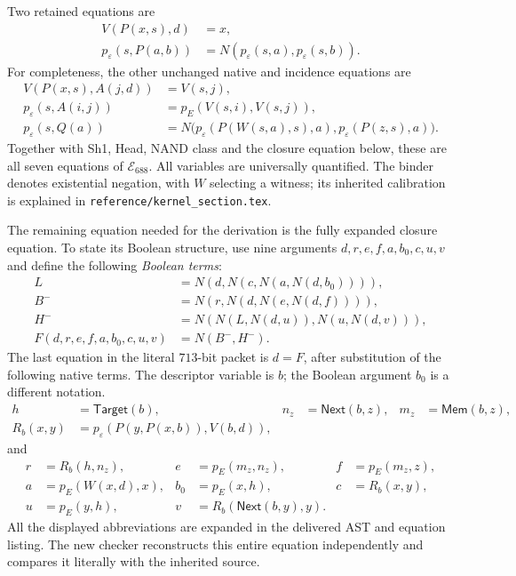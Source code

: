 Two retained equations are
\begin{align*}
 V(P(x,s),d)&=x,\tag{Head}\\
 p_\varepsilon(s,P(a,b))
    &=N(p_\varepsilon(s,a),p_\varepsilon(s,b)).\tag{NAND class}
\end{align*}
For completeness, the other unchanged native and incidence equations are
\begin{align*}
 V(P(x,s),A(j,d))&=V(s,j),\tag{Native tail}\\
 p_\varepsilon(s,A(i,j))&=p_E(V(s,i),V(s,j)),\tag{Atom class}\\
 p_\varepsilon(s,Q(a))
   &=N\bigl(p_\varepsilon(P(W(s,a),s),a),
            p_\varepsilon(P(z,s),a)\bigr).\tag{Binder}
\end{align*}
Together with Sh1, Head, NAND class and the closure equation below,
these are all seven equations of $\mathcal E_{688}$. All variables are
universally quantified. The binder denotes existential negation, with
$W$ selecting a witness; its inherited calibration is explained in
\texttt{reference/kernel\_section.tex}.

The remaining equation needed for the derivation is the fully expanded
closure equation. To state its Boolean structure, use nine arguments
$d,r,e,f,a,b_0,c,u,v$ and define the following \emph{Boolean terms}:
\begin{align*}
 L&=N(d,N(c,N(a,N(d,b_0)))),\\
 B^-&=N(r,N(d,N(e,N(d,f)))),\\
 H^-&=N(N(L,N(d,u)),N(u,N(d,v))),\\
 F(d,r,e,f,a,b_0,c,u,v)&=N(B^-,H^-).
\end{align*}
The last equation in the literal $713$-bit packet is $d=F$, after
substitution of the following native terms. The descriptor variable is
$b$; the Boolean argument $b_0$ is a different notation.
\begin{align*}
 h&=\mathsf{Target}(b),&
 n_z&=\mathsf{Next}(b,z),&
 m_z&=\mathsf{Mem}(b,z),\\
 R_b(x,y)&=p_\varepsilon(P(y,P(x,b)),V(b,d)),&&&
\end{align*}
and
\begin{align*}
 r&=R_b(h,n_z),&e&=p_E(m_z,n_z),&f&=p_E(m_z,z),\\
 a&=p_E(W(x,d),x),&b_0&=p_E(x,h),&c&=R_b(x,y),\\
 u&=p_E(y,h),&v&=R_b(\mathsf{Next}(b,y),y).&&
\end{align*}
All the displayed abbreviations are expanded in the delivered AST and
equation listing. The new checker reconstructs this entire equation
independently and compares it literally with the inherited source.

